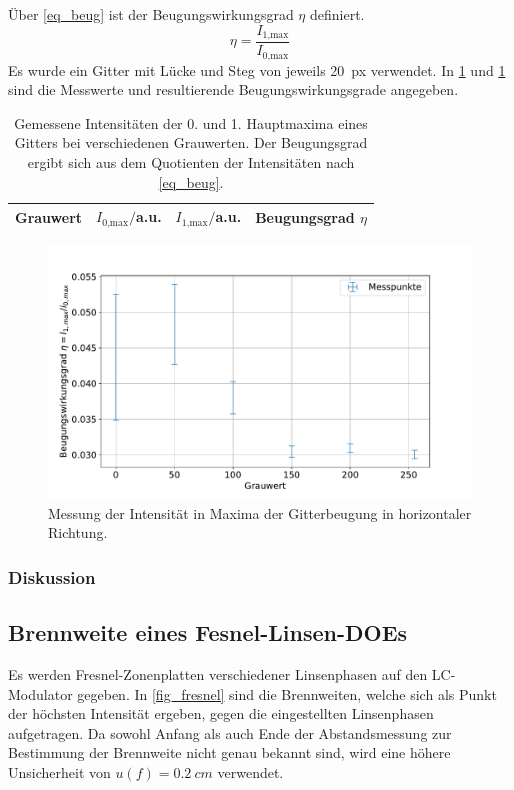 \documentclass[
	a4paper,
	12pt,
	pagesize,
	ngerman
]{scrartcl}
\begin{document}
		Über \cref{eq_beug} ist der Beugungswirkungsgrad $\eta$ definiert.
		\begin{equation}
			\label{eq_beug}
			\eta = \frac{I_\text{1,max}}{I_\text{0,max}}
		\end{equation}
		Es wurde ein Gitter mit Lücke und Steg von jeweils \SI{20}{px} verwendet.
		In \cref{tb_beug} und \cref{fig_beug} sind die Messwerte und resultierende Beugungswirkungsgrade angegeben.
\begin{table}[H]
		\centering
		\begin{tabular}{ c | c | c | c }
			 Grauwert & $I_\text{0,max}/$a.u. &$I_\text{1,max}/$a.u.&  Beugungsgrad $\eta$ \\ \hline
			 
		\end{tabular}
		\caption{
		Gemessene Intensitäten der 0. und 1. Hauptmaxima eines Gitters bei verschiedenen Grauwerten.
		Der Beugungsgrad ergibt sich aus dem Quotienten der Intensitäten nach \cref{eq_beug}.
		}
		\label{tb_beug}
\end{table}
\begin{figure}[H] %
			\includegraphics[width=0.8\linewidth]{img/beugungsgrad}
			\caption{
			Messung der Intensität in Maxima der Gitterbeugung in horizontaler Richtung.
			}
			\label{fig_beug}
	\end{figure}
			\subsubsection*{Diskussion}

		\subsection{Brennweite eines Fesnel-Linsen-DOEs}
		Es werden Fresnel-Zonenplatten verschiedener Linsenphasen auf den LC-Modulator gegeben.
		In \cref{fig_fresnel} sind die Brennweiten, welche sich als Punkt der höchsten Intensität ergeben, gegen die eingestellten Linsenphasen aufgetragen.
		Da sowohl Anfang als auch Ende der Abstandsmessung zur Bestimmung der Brennweite nicht genau bekannt sind, wird eine höhere Unsicherheit von $u(f)=\SI{0.2}{cm}$ verwendet.
\end{document}
